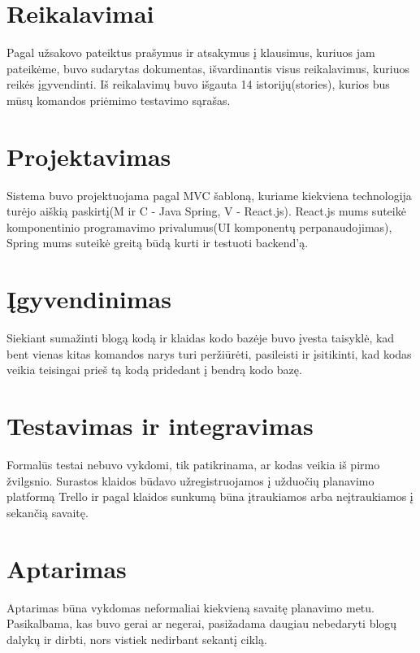 \documentclass{VUMIFInfKursinis}
\begin{document}
\section{Reikalavimai}
Pagal užsakovo pateiktus prašymus ir atsakymus į klausimus, kuriuos jam pateikėme, buvo sudarytas dokumentas, išvardinantis visus reikalavimus, kuriuos reikės įgyvendinti. Iš reikalavimų buvo išgauta 14 istorijų(stories), kurios bus mūsų komandos priėmimo testavimo sąrašas.
\section{Projektavimas}
Sistema buvo projektuojama pagal MVC šabloną, kuriame kiekviena technologija turėjo aiškią paskirtį(M ir C - Java Spring, V - React.js). React.js mums suteikė komponentinio programavimo privalumus(UI komponentų perpanaudojimas), Spring mums suteikė greitą būdą kurti ir testuoti backend'ą.
\section{Įgyvendinimas}
Siekiant sumažinti blogą kodą ir klaidas kodo bazėje buvo įvesta taisyklė, kad bent vienas kitas komandos narys turi peržiūrėti, pasileisti ir įsitikinti, kad kodas veikia teisingai prieš tą kodą pridedant į bendrą kodo bazę.
\section{Testavimas ir integravimas}
Formalūs testai nebuvo vykdomi, tik patikrinama, ar kodas veikia iš pirmo žvilgsnio. Surastos klaidos būdavo užregistruojamos į užduočių planavimo platformą Trello ir pagal klaidos sunkumą būna įtraukiamos arba neįtraukiamos į sekančią savaitę.
\section{Aptarimas}
Aptarimas būna vykdomas neformaliai kiekvieną savaitę planavimo metu. Pasikalbama, kas buvo gerai ar negerai, pasižadama daugiau nebedaryti blogų dalykų ir dirbti, nors vistiek nedirbant sekantį ciklą.
\end{document}
